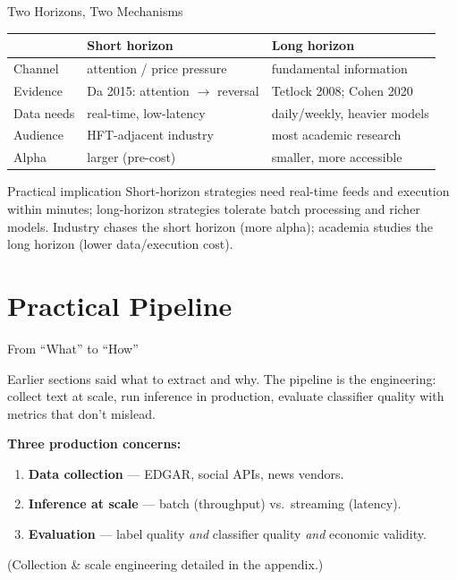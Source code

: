 \documentclass[9pt,t]{beamer}
\begin{document}
\begin{frame}{Two Horizons, Two Mechanisms}
\begin{tabular}{lll}
\toprule
 & \textbf{Short horizon} & \textbf{Long horizon} \\
\midrule
Channel    & attention / price pressure & fundamental information \\
Evidence   & Da 2015: attention $\to$ reversal & Tetlock 2008; Cohen 2020 \\
Data needs & real-time, low-latency      & daily/weekly, heavier models \\
Audience   & HFT-adjacent industry       & most academic research \\
Alpha      & larger (pre-cost)           & smaller, more accessible \\
\bottomrule
\end{tabular}

\medskip
\begin{block}{Practical implication}
Short-horizon strategies need real-time feeds and execution within minutes;
long-horizon strategies tolerate batch processing and richer models. Industry
chases the short horizon (more alpha); academia studies the long horizon
(lower data/execution cost).
\end{block}
\end{frame}

\section{Practical Pipeline}

\begin{frame}{From ``What'' to ``How''}
\begin{bigpicture}
Earlier sections said what to extract and why. The pipeline is the
engineering: collect text at scale, run inference in production, evaluate
classifier quality with metrics that don't mislead.
\end{bigpicture}

\medskip
\textbf{Three production concerns:}
\begin{enumerate}
  \item \textbf{Data collection} --- EDGAR, social APIs, news vendors.
  \item \textbf{Inference at scale} --- batch (throughput) vs.\ streaming (latency).
  \item \textbf{Evaluation} --- label quality \emph{and} classifier quality
        \emph{and} economic validity.
\end{enumerate}
(Collection \& scale engineering detailed in the appendix.)
\end{frame}
\end{document}

